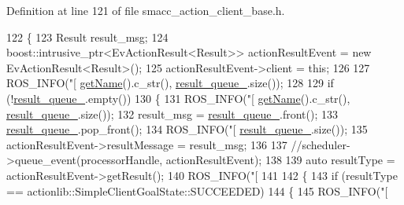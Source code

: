 Definition at line 121 of file smacc\+\_\+action\+\_\+client\+\_\+base.\+h.


\begin{DoxyCode}
122     \{
123         Result result\_msg;
124         boost::intrusive\_ptr<EvActionResult<Result>> actionResultEvent = \textcolor{keyword}{new} EvActionResult<Result>();
125         actionResultEvent->client = \textcolor{keyword}{this};
126 
127         ROS\_INFO(\textcolor{stringliteral}{"[%
      \hyperlink{classsmacc_1_1ISmaccComponent_aa314809a7fd3516461e31cc120d0cfe7}{getName}().c\_str(), \hyperlink{classsmacc_1_1SmaccActionClientBase_a42c2e070235e6eeaca970c2abaeabec4}{result\_queue\_}.size());
128 
129         \textcolor{keywordflow}{if} (!\hyperlink{classsmacc_1_1SmaccActionClientBase_a42c2e070235e6eeaca970c2abaeabec4}{result\_queue\_}.empty())
130         \{
131             ROS\_INFO(\textcolor{stringliteral}{"[%
      \hyperlink{classsmacc_1_1ISmaccComponent_aa314809a7fd3516461e31cc120d0cfe7}{getName}().c\_str(), \hyperlink{classsmacc_1_1SmaccActionClientBase_a42c2e070235e6eeaca970c2abaeabec4}{result\_queue\_}.size());
132             result\_msg = \hyperlink{classsmacc_1_1SmaccActionClientBase_a42c2e070235e6eeaca970c2abaeabec4}{result\_queue\_}.front();
133             \hyperlink{classsmacc_1_1SmaccActionClientBase_a42c2e070235e6eeaca970c2abaeabec4}{result\_queue\_}.pop\_front();
134             ROS\_INFO(\textcolor{stringliteral}{"[%
      \hyperlink{classsmacc_1_1SmaccActionClientBase_a42c2e070235e6eeaca970c2abaeabec4}{result\_queue\_}.size());
135             actionResultEvent->resultMessage = result\_msg;
136 
137             \textcolor{comment}{//scheduler->queue\_event(processorHandle, actionResultEvent);}
138 
139             \textcolor{keyword}{auto} resultType = actionResultEvent->getResult();
140             ROS\_INFO(\textcolor{stringliteral}{"[%
141 
142             \{
143                 \textcolor{keywordflow}{if} (resultType == actionlib::SimpleClientGoalState::SUCCEEDED)
144                 \{
145                     ROS\_INFO(\textcolor{stringliteral}{"[%
}}}}}
\end{DoxyCode}
